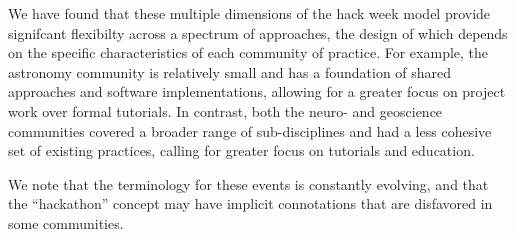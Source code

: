 We have found that these multiple dimensions of the hack week model provide signifcant flexibilty across a spectrum of approaches, the design of which depends on the specific characteristics of each community of practice.
For example, the astronomy community is relatively small and has a foundation of shared approaches and software implementations, allowing for a greater focus on project work over formal tutorials.
In contrast, both the neuro- and geoscience communities covered a broader range of sub-disciplines and had a less cohesive set of existing practices, calling for greater focus on tutorials and education.

We note that the terminology for these events is constantly evolving, and that the ``hackathon'' concept may have implicit connotations that are disfavored in some communities.




